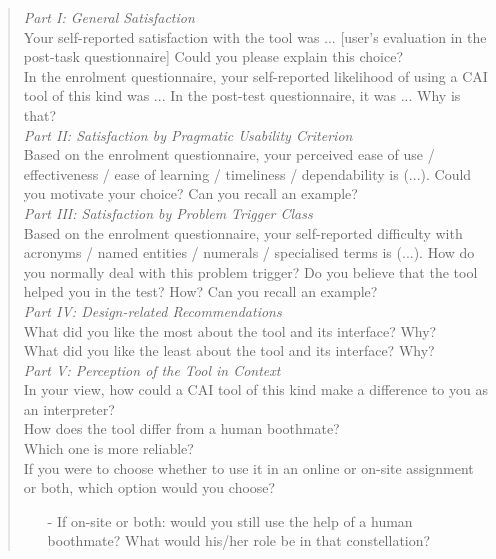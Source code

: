 \begin{quote}
    \textit{Part I: General Satisfaction}\\

Your self-reported satisfaction with the tool was ... [user’s evaluation in the post-task questionnaire] Could you please explain this choice?\\

In the enrolment questionnaire, your self-reported likelihood of using a CAI tool of this kind was ... In the post-test questionnaire, it was ... Why is that?\\

\textit{Part II: Satisfaction by Pragmatic Usability Criterion}\\

Based on the enrolment questionnaire, your perceived ease of use / effectiveness / ease of learning / timeliness / dependability is (...). Could you motivate your choice? Can you recall an example?\\

\textit{Part III: Satisfaction by Problem Trigger Class}\\

Based on the enrolment questionnaire, your self-reported difficulty with acronyms / named entities / numerals / specialised terms is (...). How do you normally deal with this problem trigger? Do you believe that the tool helped you in the test? How? Can you recall an example?\\

\textit{Part IV: Design-related Recommendations}\\

What did you like the most about the tool and its interface? Why?\\

What did you like the least about the tool and its interface? Why?\\

\textit{Part V: Perception of the Tool in Context}\\

In your view, how could a CAI tool of this kind make a difference to you as an interpreter?\\

How does the tool differ from a human boothmate?\\

Which one is more reliable?\\

If you were to choose whether to use it in an online or on-site assignment or both, which option would you choose?\\
\begin{itemize}
    \item [-] If on-site or both: would you still use the help of a human boothmate? What would his/her role be in that constellation?
\end{itemize}
\end{quote}




